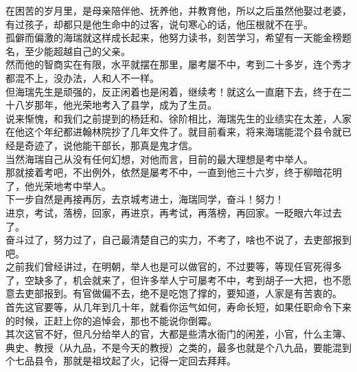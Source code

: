 \begin{multicols}{\theparacolNo}
在困苦的岁月里，是母亲陪伴他、抚养他，并教育他，所以之后虽然他娶过老婆，有过孩子，却都只是他生命中的过客，说句寒心的话，他压根就不在乎。\\

孤僻而偏激的海瑞就这样成长起来，他努力读书，刻苦学习，希望有一天能金榜题名，至少能超越自己的父亲。\\

然而他的智商实在有限，水平就摆在那里，屡考屡不中，考到二十多岁，连个秀才都混不上，没办法，人和人不一样。\\

但海瑞先生是顽强的，反正闲着也是闲着，继续考！就这么一直磨下去，终于在二十八岁那年，他光荣地考入了县学，成为了生员。\\

说来惭愧，和我们之前提到的杨廷和、徐阶相比，海瑞先生的业绩实在太差，人家在他这个年纪都进翰林院抄了几年文件了。就目前看来，将来海瑞能混个县令就已经是奇迹了，说他能干部长，那真是鬼才信。\\

当然海瑞自己从没有任何幻想，对他而言，目前的最大理想是考中举人。\\

那就接着考吧，不出例外，依然是屡考不中，一直到他三十六岁，终于柳暗花明了，他光荣地考中举人。\\

下一步自然是再接再厉，去京城考进士，海瑞同学，奋斗！努力！\\

进京，考试，落榜，回家，再进京，再考试，再落榜，再回家。一眨眼六年过去了。\\

奋斗过了，努力过了，自己最清楚自己的实力，不考了，啥也不说了，去吏部报到吧。\\

之前我们曾经讲过，在明朝，举人也是可以做官的，不过要等，等现任官死得多了，空缺多了，机会就来了，但许多举人宁可屡考不中，考到胡子一大把，也不愿意去吏部报到。有官做偏不去，绝不是吃饱了撑的，要知道，人家是有苦衷的。\\

首先这官要等，从几年到几十年，就看你运气如何，寿命长短，如果任职命令下来的时候，正赶上你的追悼会，那也不能说你倒霉。\\

其次这官不好，但凡分给举人的官，大都是些清水衙门的闲差，小官，什么主簿、典史、教授（从九品，不是今天的教授）之类的，最多也就是个八九品，要能混到个七品县令，那就是祖坟起了火，记得一定回去拜拜。\\


\end{multicols}
